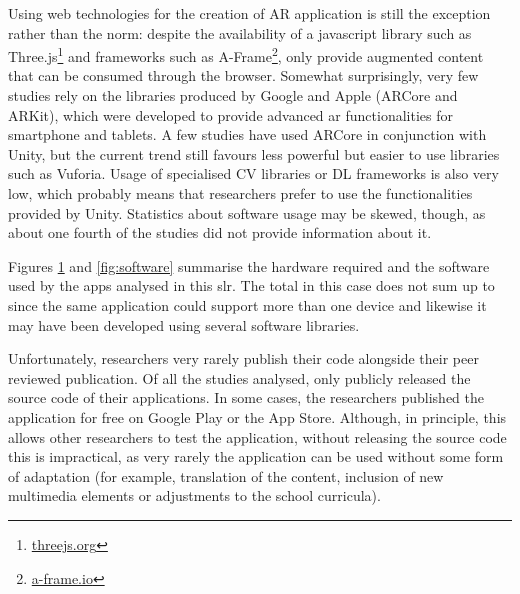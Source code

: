 Using web technologies for the creation of AR application is still the exception rather than the norm: despite the availability of a javascript library such as Three.js\footnote{\url{threejs.org}} and frameworks such as A-Frame\footnote{\url{a-frame.io}}, only \cite{abriata2020building, protopsaltis2016quiz, rodriguez2021molecularweb} provide augmented content that can be consumed through the browser.
Somewhat surprisingly, very few studies rely on the libraries produced by Google and Apple (ARCore and ARKit), which were developed to provide advanced \gls{ar} functionalities for smartphone and tablets. A few studies \citep{carlos2021voluminis, costa2021interactive, acosta2020applying} have used ARCore in conjunction with Unity, but the current trend still favours less powerful but easier to use libraries such as Vuforia. Usage of specialised \gls{CV} libraries or \gls{DL} frameworks is also very low, which probably means that researchers prefer to use the functionalities provided by Unity. Statistics about software usage may be skewed, though, as about one fourth of the studies did not provide information about it.

Figures \ref{fig:hardware} and \ref{fig:software} summarise the hardware required and the software used by the apps analysed in this \gls{slr}. The total in this case does not sum up to \papersSelected since the same application could support more than one device and likewise it may have been developed using several software libraries.

\begin{figure}[htbp]	
	\begin{center}
	
	\captionsetup{font=small}
	\caption{\fontsize{10pt}{11pt}}
	\label{fig:hardware}
    \end{center}
\end{figure}

Unfortunately, researchers very rarely publish their code alongside their peer reviewed publication. Of all the studies analysed, only \cite{ManriqueJuan2017APA, laviole2018nectar, mylonas2019educational, abriata2020building, dominguez2022collaborative, farella2022arete, wellmann2022open} publicly released the source code of their applications. In some cases, the researchers published the application for free on Google Play or the App Store. Although, in principle, this allows other researchers to test the application, without releasing the source code this is impractical, as very rarely the application can be used without some form of adaptation (for example, translation of the content, inclusion of new multimedia elements or adjustments to the school curricula).

